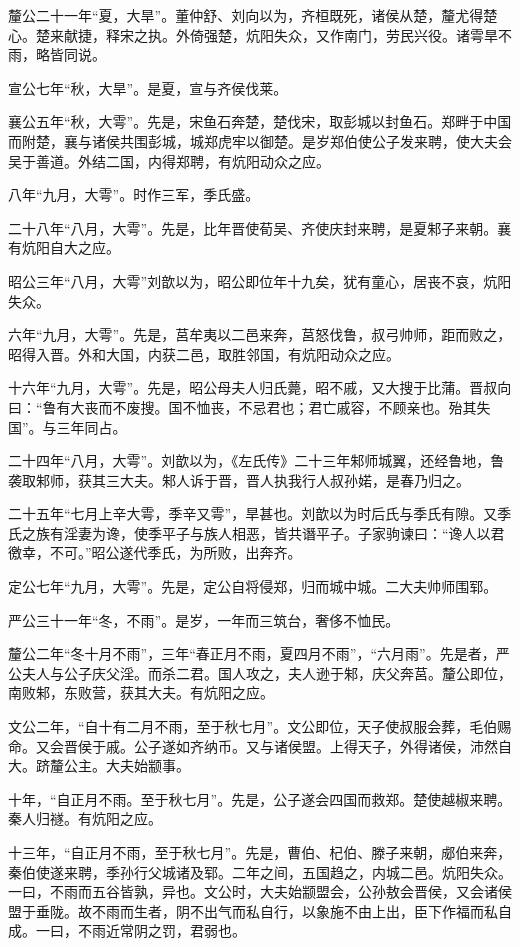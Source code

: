 \documentclass[]{article}
\begin{document}
釐公二十一年``夏，大旱''。董仲舒、刘向以为，齐桓既死，诸侯从楚，釐尤得楚心。楚来献捷，释宋之执。外倚强楚，炕阳失众，又作南门，劳民兴役。诸雩旱不雨，略皆同说。

宣公七年``秋，大旱''。是夏，宣与齐侯伐莱。

襄公五年``秋，大雩''。先是，宋鱼石奔楚，楚伐宋，取彭城以封鱼石。郑畔于中国而附楚，襄与诸侯共围彭城，城郑虎牢以御楚。是岁郑伯使公子发来聘，使大夫会吴于善道。外结二国，内得郑聘，有炕阳动众之应。

八年``九月，大雩''。时作三军，季氏盛。

二十八年``八月，大雩''。先是，比年晋使荀吴、齐使庆封来聘，是夏邾子来朝。襄有炕阳自大之应。

昭公三年``八月，大雩''刘歆以为，昭公即位年十九矣，犹有童心，居丧不哀，炕阳失众。

六年``九月，大雩''。先是，莒牟夷以二邑来奔，莒怒伐鲁，叔弓帅师，距而败之，昭得入晋。外和大国，内获二邑，取胜邻国，有炕阳动众之应。

十六年``九月，大雩''。先是，昭公母夫人归氏薨，昭不戚，又大搜于比蒲。晋叔向曰：``鲁有大丧而不废搜。国不恤丧，不忌君也；君亡戚容，不顾亲也。殆其失国''。与三年同占。

二十四年``八月，大雩''。刘歆以为，《左氏传》二十三年邾师城翼，还经鲁地，鲁袭取邾师，获其三大夫。邾人诉于晋，晋人执我行人叔孙婼，是春乃归之。

二十五年``七月上辛大雩，季辛又雩''，旱甚也。刘歆以为时后氏与季氏有隙。又季氏之族有淫妻为谗，使季平子与族人相恶，皆共谮平子。子家驹谏曰：``谗人以君徼幸，不可。''昭公遂代季氏，为所败，出奔齐。

定公七年``九月，大雩''。先是，定公自将侵郑，归而城中城。二大夫帅师围郓。

严公三十一年``冬，不雨''。是岁，一年而三筑台，奢侈不恤民。

釐公二年``冬十月不雨''，三年``春正月不雨，夏四月不雨''，``六月雨''。先是者，严公夫人与公子庆父淫。而杀二君。国人攻之，夫人逊于邾，庆父奔莒。釐公即位，南败邾，东败营，获其大夫。有炕阳之应。

文公二年，``自十有二月不雨，至于秋七月''。文公即位，天子使叔服会葬，毛伯赐命。又会晋侯于戚。公子遂如齐纳币。又与诸侯盟。上得天子，外得诸侯，沛然自大。跻釐公主。大夫始颛事。

十年，``自正月不雨。至于秋七月''。先是，公子遂会四国而救郑。楚使越椒来聘。秦人归禭。有炕阳之应。

十三年，``自正月不雨，至于秋七月''。先是，曹伯、杞伯、滕子来朝，郕伯来奔，秦伯使遂来聘，季孙行父城诸及郓。二年之间，五国趋之，内城二邑。炕阳失众。一曰，不雨而五谷皆孰，异也。文公时，大夫始颛盟会，公孙敖会晋侯，又会诸侯盟于垂陇。故不雨而生者，阴不出气而私自行，以象施不由上出，臣下作福而私自成。一曰，不雨近常阴之罚，君弱也。
\end{document}
